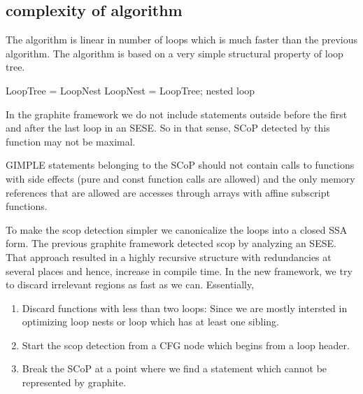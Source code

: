 \documentclass{sigplanconf}
\begin{document}
\subsection{complexity of algorithm}
The algorithm is linear in number of loops
which is much faster than the previous algorithm. The algorithm is based on a very simple structural property of loop
tree.

LoopTree = LoopNest
LoopNest = LoopTree; nested loop

In the graphite framework we do not include statements outside before the first and after the last loop in an SESE.
So in that sense, SCoP detected by this function may not be maximal.

GIMPLE statements belonging to the SCoP should not contain calls to functions with
side effects (pure and const function calls are allowed) and the only memory references
that are allowed are accesses through arrays with affine subscript functions.

To make the scop detection simpler we canonicalize the loops into a closed SSA form.
The previous graphite framework detected scop by analyzing an SESE. That approach resulted in a highly recursive structure
with redundancies at several places and hence, increase in compile time. In the new framework, we try to discard irrelevant
regions as fast as we can. Essentially,

\begin{enumerate}
\item Discard functions with less than two loops: Since we are mostly intersted in optimizing loop nests
or loop which has at least one sibling.
\item Start the scop detection from a CFG node which begins from a loop header.
\item Break the SCoP at a point where we find a statement which cannot be represented by graphite.
\end{enumerate}
\end{document}
